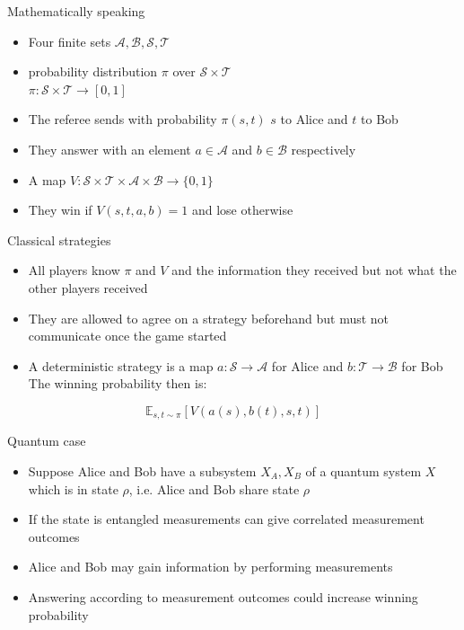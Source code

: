 \begin{frame}{Mathematically speaking}
\begin{itemize}
    \item Four finite sets $\mathcal{A}, \mathcal{B}, \mathcal{S}, \mathcal{T}$
    \item probability distribution $\pi$ over $\mathcal{S} \times \mathcal{T}$ \\ $\pi : \mathcal{S} \times \mathcal{T} \rightarrow [0,1]$
    \item The referee sends with probability $\pi (s,t)$ $s$ to Alice and $t$ to Bob
    \item They answer with an element $a \in \mathcal{A}$ and $b \in \mathcal{B}$ respectively
    \item A map $V : \mathcal{S} \times \mathcal{T} \times \mathcal{A} \times \mathcal{B} \rightarrow \{ 0, 1 \}$
    \item They win if $V(s,t,a,b)=1$ and lose otherwise
\end{itemize}
\end{frame}

\begin{frame}{Classical strategies}
    \begin{itemize}
        \item All players know $\pi$ and $V$ and the information they received but not what the other players received
        \item They are allowed to agree on a strategy beforehand \pause but must not communicate once the game started
        \item A deterministic strategy is a map $a : \mathcal{S} \rightarrow \mathcal{A}$ for Alice and $b : \mathcal{T} \rightarrow \mathcal{B}$ for Bob
        The winning probability then is:
    \end{itemize}
    \begin{equation*}
        \mathbb{E}_{s,t \sim \pi} \left[ V(a(s),b(t),s,t) \right]
\end{equation*}
\end{frame}

\begin{frame}{Quantum case}
\begin{itemize}
    \item Suppose Alice and Bob have a subsystem $X_A, X_B$ of a quantum system $X$ which is in state $\rho$, i.e. Alice and Bob share state $\rho$
    \item If the state is entangled measurements can give correlated measurement outcomes
    \item Alice and Bob may gain information by performing measurements
    \item Answering according to measurement outcomes could increase winning probability 
\end{itemize}
\end{frame}


